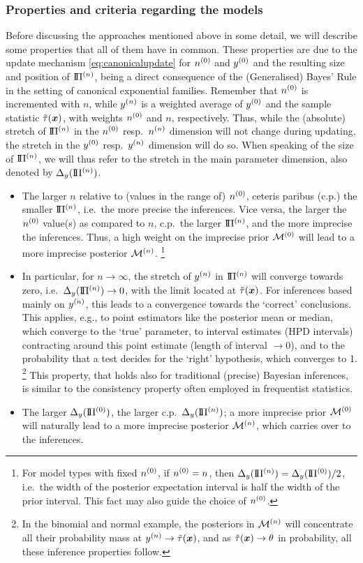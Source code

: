 \subsubsection{Properties and criteria regarding the models}

Before discussing the approaches mentioned above in some detail,
we will describe some properties that all of them have in common.
These properties are due to the update mechanism \eqref{eq:canonicalupdate}
for $n^{(0)}$ and $y^{(0)}$ and the resulting size and position of $\text{I}\!\Pi^{(n)}$,
being a direct consequence of the (Generalised) Bayes' Rule in the setting of canonical exponential families.
Remember that $n^{(0)}$ is incremented with $n$, while $y^{(n)}$ is a weighted average of $y^{(0)}$ and the sample statistic $\tilde{\tau}({\bm x})$,
with weights $n^{(0)}$ and $n$, respectively.
Thus, while the (absolute) stretch of $\text{I}\!\Pi^{(n)}$ in the $n^{(0)}$ resp.\ $n^{(n)}$ dimension will not change during updating,
the stretch in the $y^{(0)}$ resp.\ $y^{(n)}$ dimension will do so.
When speaking of the size of $\text{I}\!\Pi^{(n)}$, we will thus refer to the stretch in the main parameter dimension, also denoted by $\Delta_y(\text{I}\!\Pi^{(n)})$.
\begin{itemize}
\item The larger $n$ relative to (values in the range of) $n^{(0)}$,
ceteris paribus (c.p.) the smaller $\text{I}\!\Pi^{(n)}$, i.e.\ the more precise the inferences.
Vice versa, the larger the $n^{(0)}$ value(s) as compared to $n$, c.p.\ the larger $\text{I}\!\Pi^{(n)}$, and the more imprecise the inferences.
Thus, a high weight on the imprecise prior $\mathcal{M}^{(0)}$ will lead to a more imprecise posterior $\mathcal{M}^{(n)}$.%
\footnote{For model types with fixed $n^{(0)}$, if $n^{(0)} = n$, then $\Delta_y(\text{I}\!\Pi^{(n)}) = \Delta_y(\text{I}\!\Pi^{(0)}) / 2$,
i.e.\ the width of the posterior expectation interval is half the width of the prior interval.
This fact may also guide the choice of $n^{(0)}$.}
\item In particular, for $n \to \infty$, the stretch of $y^{(n)}$ in $\text{I}\!\Pi^{(n)}$ will converge towards zero,
i.e.\ $\Delta_y(\text{I}\!\Pi^{(n)}) \to 0$, with the limit located at $\tilde{\tau}({\bm x})$.
For inferences based mainly on $y^{(n)}$, this leads to a convergence towards the `correct' conclusions.
This applies, e.g., to point estimators like the posterior mean or median, which converge to the `true' parameter,
to interval estimates (HPD intervals) contracting around this point estimate (length of interval $\to 0$),
and to the probability that a test decides for the `right' hypothesis, which converges to 1.%
\footnote{In the binomial and normal example,
the posteriors in $\mathcal{M}^{(n)}$ will concentrate all their probability mass at $y^{(n)} \to \tilde{\tau}({\bm x})$,
and as $\tilde{\tau}({\bm x}) \to \theta$ in probability, all these inference properties follow.}
This property, that holds also for traditional (precise) Bayesian inferences,
is similar to the consistency property often employed in frequentist statistics.
\item The larger $\Delta_y(\text{I}\!\Pi^{(0)})$, the larger c.p.\ $\Delta_y(\text{I}\!\Pi^{(n)})$;
a more imprecise prior $\mathcal{M}^{(0)}$ will naturally lead to a more imprecise posterior $\mathcal{M}^{(n)}$, which carries over to the inferences.
\end{itemize}


